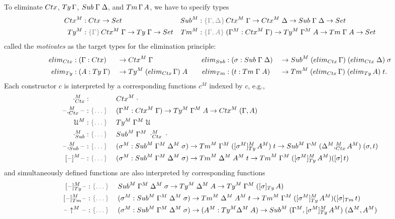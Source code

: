 \documentclass[a4paper,UKenglish,numberwithinsect,cleveref,thm-restate]{lipics-v2021}
\begin{document}
To eliminate $\Ctx$, $\Ty\,\Gamma$, $\Sub\;\Gamma\;\Delta$, and $\Tm\,\Gamma\,A$, we have to specify types
\begin{align*}
  \Ctx^M & : \Ctx \to \Set &
  \Sub^M & : \implicit{\Gamma, \Delta}\,\Ctx^M\;\Gamma \to \Ctx^M\;\Delta \to \Sub\;\Gamma\;\Delta \to \Set \\
  \Ty^M  & : \implicit{\Gamma}\,\Ctx^M\;\Gamma \to \Ty\;\Gamma \to \Set & 
  \Tm^M  & : \implicit{\Gamma, A}\; (\Gamma^M : \Ctx^M\;\Gamma) \to \Ty^M\;\Gamma^M\;A \to \Tm\;\Gamma\;A \to \Set
\end{align*}
called the \emph{motivates} as the target types for the elimination principle:
\begin{alignat*}{5}
  \elim_{\Ctx} & : (\Gamma : \Ctx)   && \to \Ctx^M\;\Gamma &
  \elim_{\Sub} & : (\sigma : \Sub\;\Gamma\;\Delta) && \to \Sub^M\;(\elim_{\Ctx}\,\Gamma)\;(\elim_{\Ctx}\;\Delta)\;\sigma \\
  \elim_{\Ty}  & : (A : \Ty\;\Gamma) && \to \Ty^M\;(\elim_{\Ctx}\,\Gamma)\;A \quad
               & \elim_{\Tm}  & : (t : \Tm\;\Gamma\;A) && \to \Tm^M\;(\elim_{\Ctx}\,\Gamma)\;(\elim_{\Ty}\,A)\;t.
\end{alignat*}
Each constructor $c$ is interpreted by a corresponding functions $c^M$ indexed by $c$, e.g.,\ 
\begin{alignat*}{3}
  \emptyctx_{\Ctx}^M     & :                    && \Ctx^M\;\emptyctx \\
  \blank,_{\Ctx}^M\blank & : \implicit{\dots}\; && (\Gamma^M : \Ctx^M\;\Gamma) \to \Ty^M\;\Gamma^M\;A \to \Ctx^M\;(\Gamma, A) \\
  \UU^M & : \implicit{\dots} && \Ty^M\;\Gamma^M\;\UU \\
  \emptysub_{\Sub}^M     & : \implicit{\dots}   && \Sub^M\;\Gamma^M\;\emptyctx_{\Ctx}^M\;\cdot \\
  \blank,_{\Sub}^M\blank & : \implicit{\dots}   && (\sigma^M : \Sub^M\;\Gamma^M\;\Delta^M\;\sigma) \to \Tm^M\;\Gamma^M\;([\sigma^M]^M_{\Ty}\,A^M)\;t \to \Sub^M\;\Gamma^M\;(\Delta^M ,^M_{\Ctx} A^M)\;(\sigma, t) \\
  [\blank]^M\blank & : \implicit{\dots} && (\sigma^M : \Sub^M\;\Gamma^M\;\Delta^M\;\sigma) \to \Tm^M\;\Delta^M\;A^M\;t \to \Tm^M\;\Gamma^M\;([\sigma^M]_{\Ty}^M\,A^M)([\sigma]\,t)
\end{alignat*}
and simultaneously defined functions are also interpreted by corresponding functions 
\begin{alignat*}{3}
  [\blank]_{\Ty}^M\blank & : \implicit{\dots} \; && \Sub^M\;\Gamma^M\;\Delta^M\;\sigma \to \Ty^M\;\Delta^M\;A \to \Ty^M\;\Gamma^M\;([\sigma]_{\Ty}\,A) \\
  [\blank]_{\Tm}^M\blank & : \implicit{\dots} && (\sigma^M : \Sub^M\;\Gamma^M\;\Delta^M\;\sigma) \to \Tm^M\;\Delta^M\;A^M\;t \to \Tm^M\;\Gamma^M\;([\sigma^M]_{\Ty}^M\,A^M)([\sigma]_{\Tm}\,t) \\
  \blank\uparrow^M\blank & : \implicit{\dots} \; && (\sigma^M : \Sub^M\;\Gamma^M\;\Delta^M\;\sigma) \to (A^M : \Ty^M\Delta^M\;A) \to
    \Sub^M\;(\Gamma^M, [\sigma^M]_{\Ty}^M\,A^M)\;(\Delta^M, A^M)
\end{alignat*}
\end{document}
